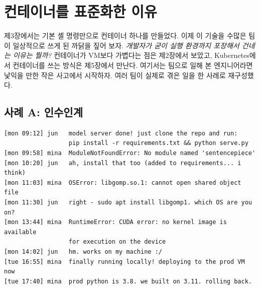 \section{컨테이너를 표준화한 이유}

제3장에서는 기본 셸 명령만으로 컨테이너 하나를 만들었다. 이제 이 기술을 수많은 팀이 일상적으로 쓰게 된 까닭을 짚어 보자. \textit{개발자가 굳이 실행 환경까지 포장해서 건네는 이유는 뭘까?} 컨테이너가 VM보다 가볍다는 점은 제2장에서 보았고, Kubernetes에서 컨테이너를 쓰는 방식은 제5장에서 만난다. 여기서는 팀으로 일해 본 엔지니어라면 낯익을 만한 작은 사고에서 시작하자. 여러 팀이 실제로 겪은 일을 한 사례로 재구성했다.

\subsection*{사례 A: 인수인계}

\begin{terminalbox}
\begin{Verbatim}[breaklines=true,breakanywhere=true,fontsize=\small,formatcom=\color{tbbtermfg},codes=\tbbcodeactive]
[mon 09:12] jun   model server done! just clone the repo and run:
                  pip install -r requirements.txt && python serve.py
[mon 09:58] mina  ModuleNotFoundError: No module named 'sentencepiece'
[mon 10:20] jun   ah, install that too (added to requirements... i think)
[mon 11:03] mina  OSError: libgomp.so.1: cannot open shared object file
[mon 11:30] jun   right - sudo apt install libgomp1. which OS are you on?
[mon 13:44] mina  RuntimeError: CUDA error: no kernel image is available
                  for execution on the device
[mon 14:02] jun   hm. works on my machine :/
[tue 16:55] mina  finally running locally! deploying to the prod VM now
[tue 17:40] mina  prod python is 3.8. we built on 3.11. rolling back.
\end{Verbatim}
\end{terminalbox}

